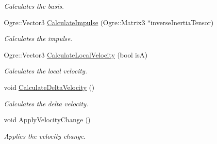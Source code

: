 \begin{DoxyCompactItemize}
\begin{DoxyCompactList}\small\item\em Calculates the basis. \end{DoxyCompactList}\item 
Ogre\-::\-Vector3 \hyperlink{struct_physics_1_1_contact_abfcbcf99965cfb14c0783273425d7146}{Calculate\-Impulse} (Ogre\-::\-Matrix3 $\ast$inverse\-Inertia\-Tensor)
\begin{DoxyCompactList}\small\item\em Calculates the impulse. \end{DoxyCompactList}\item 
Ogre\-::\-Vector3 \hyperlink{struct_physics_1_1_contact_a4bd61cf39173cce1c6e8a18f5167e292}{Calculate\-Local\-Velocity} (bool is\-A)
\begin{DoxyCompactList}\small\item\em Calculates the local velocity. \end{DoxyCompactList}\item 
\hypertarget{struct_physics_1_1_contact_aaa7af89cab011f241b3a285359bb4f29}{void \hyperlink{struct_physics_1_1_contact_aaa7af89cab011f241b3a285359bb4f29}{Calculate\-Delta\-Velocity} ()}\label{struct_physics_1_1_contact_aaa7af89cab011f241b3a285359bb4f29}

\begin{DoxyCompactList}\small\item\em Calculates the delta velocity. \end{DoxyCompactList}\item 
\hypertarget{struct_physics_1_1_contact_ae7399c52092639c07e7af1595bd4a093}{void \hyperlink{struct_physics_1_1_contact_ae7399c52092639c07e7af1595bd4a093}{Apply\-Velocity\-Change} ()}\label{struct_physics_1_1_contact_ae7399c52092639c07e7af1595bd4a093}

\begin{DoxyCompactList}\small\item\em Applies the velocity change. \end{DoxyCompactList}\end{DoxyCompactItemize}
